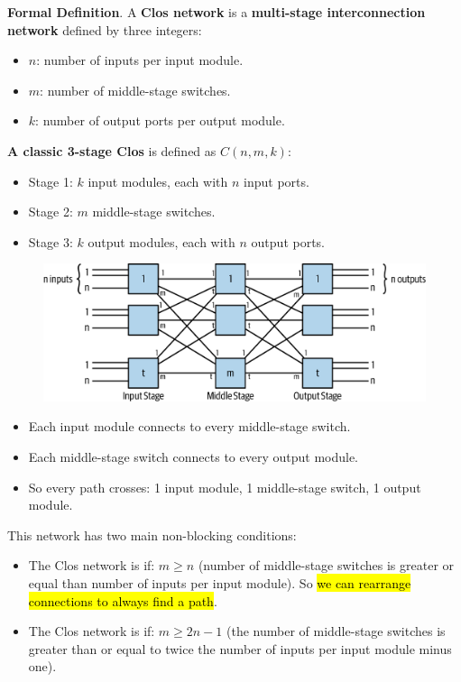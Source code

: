 \highspace
\textcolor{Green3}{ \textbf{Formal Definition}}. A \textbf{Clos network} is a \textbf{multi-stage interconnection network} defined by three integers:
\begin{itemize}
    \item $n$: number of inputs per input module.
    \item $m$: number of middle-stage switches.
    \item $k$: number of output ports per output module.
\end{itemize}
\textbf{A classic 3-stage Clos} is defined as $C(n, m, k)$:
\begin{itemize}
    \item Stage 1: $k$ input modules, each with $n$ input ports.
    \item Stage 2: $m$ middle-stage switches.
    \item Stage 3: $k$ output modules, each with $n$ output ports.
\end{itemize}
\begin{figure}[!htp]
    \centering
    \includegraphics[width=\textwidth]{img/clos-network.png}
\end{figure}
\begin{itemize}
    \item Each input module connects to every middle-stage switch.
    \item Each middle-stage switch connects to every output module.
    \item So every path crosses: 1 input module, 1 middle-stage switch, 1 output module.
\end{itemize}
This network has two main non-blocking conditions:
\begin{itemize}
    \item The Clos network is  if: $m \geq n$ (number of middle-stage switches is greater or equal than number of inputs per input module). So \hl{we can rearrange connections to always find a path}.
    \item The Clos network is  if: $m \geq 2n - 1$ (the number of middle-stage switches is greater than or equal to twice the number of inputs per input module minus one).
\end{itemize}
